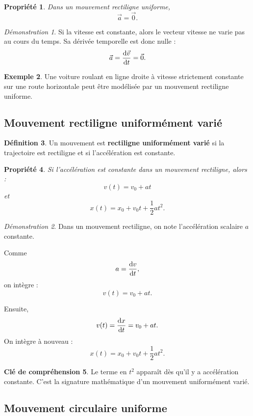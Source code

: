 \documentclass[11pt,a4paper]{article}
\theoremstyle{definition}
\newtheorem{definition}{Définition}[section]
\newtheorem{exemple}[definition]{Exemple}
\newtheorem{interpretation}[definition]{Clé de compréhension}
\theoremstyle{plain}
\newtheorem{propriete}[definition]{Propriété}
\theoremstyle{remark}
\newtheorem*{demonstrationlibre}{Démonstration}
\begin{document}
\begin{propriete}
Dans un mouvement rectiligne uniforme,
\[
\vec{a}=\vec{0}.
\]
\end{propriete}

\begin{demonstrationlibre}
Si la vitesse est constante, alors le vecteur vitesse ne varie pas au cours du temps. Sa dérivée temporelle est donc nulle :
\[
\vec{a}=\dv{\vec{v}}{t}=\vec{0}.
\]
\end{demonstrationlibre}

\begin{exemple}
Une voiture roulant en ligne droite à vitesse strictement constante sur une route horizontale peut être modélisée par un mouvement rectiligne uniforme.
\end{exemple}

\subsection{Mouvement rectiligne uniformément varié}

\begin{definition}
Un mouvement est \textbf{rectiligne uniformément varié} si la trajectoire est rectiligne et si l'accélération est constante.
\end{definition}

\begin{propriete}
Si l'accélération est constante dans un mouvement rectiligne, alors :
\[
v(t)=v_0+at
\]
et
\[
x(t)=x_0+v_0t+\frac12 at^2.
\]
\end{propriete}

\begin{demonstrationlibre}
Dans un mouvement rectiligne, on note l'accélération scalaire $a$ constante.  

Comme
\[
a=\dv{v}{t},
\]
on intègre :
\[
v(t)=v_0+at.
\]

Ensuite,
\[
v(t)=\dv{x}{t}=v_0+at.
\]
On intègre à nouveau :
\[
x(t)=x_0+v_0t+\frac12 at^2.
\]
\end{demonstrationlibre}

\begin{interpretation}
Le terme en $t^2$ apparaît dès qu'il y a accélération constante. C'est la signature mathématique d'un mouvement uniformément varié.
\end{interpretation}

\subsection{Mouvement circulaire uniforme}
\end{document}

